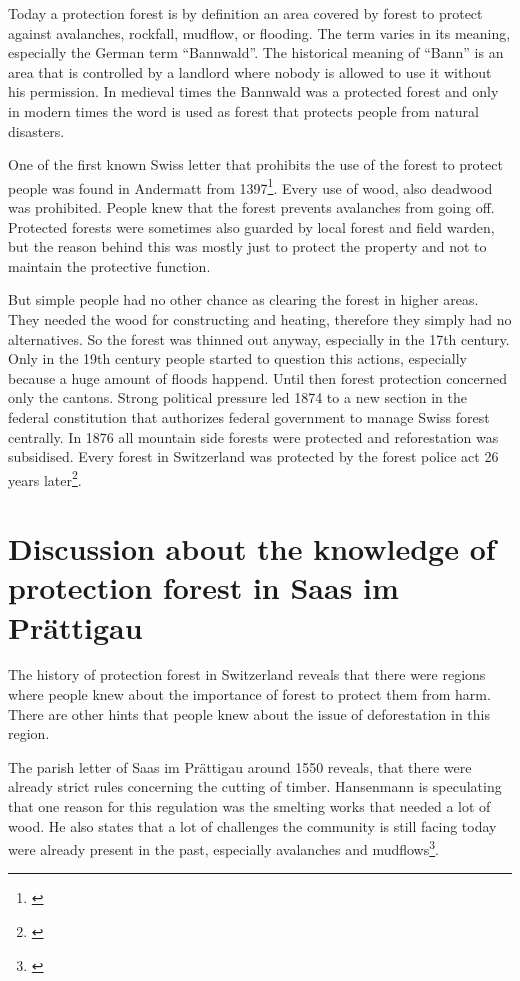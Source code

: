 \documentclass[12pt, a4paper]{article}
\begin{document}
Today a protection forest is by definition an area covered by forest to protect against avalanches, rockfall, mudflow, 
or flooding. The term varies in its meaning, especially the German term ``Bannwald''. The historical meaning of ``Bann'' 
is an area that is controlled by a landlord where nobody is allowed to use it without his permission. In medieval times 
the Bannwald was a protected forest and only in  modern times the word is used as forest that protects people from natural 
disasters.

One of the first known Swiss letter that prohibits the use of the forest to protect people was found in Andermatt 
from 1397\footnote{\citet[p.~104]{pfister2002tag}}. Every use of wood, also deadwood was prohibited. People knew that 
the forest prevents avalanches from going off. Protected forests were sometimes also guarded by local forest and field 
warden, but the reason behind this was mostly just to protect the property and not to maintain the protective function. 

But simple people had no other chance as clearing the forest in higher areas. They needed the wood for constructing and 
heating, therefore they simply had no alternatives. So the forest was thinned out anyway, especially in the 17th century. 
Only in the 19th century people started to question this actions, especially because a huge amount of floods happend. 
Until then forest protection concerned only the cantons. Strong political pressure led 1874 to a new section in the federal 
constitution that authorizes federal government to manage Swiss forest centrally. In 1876 all mountain side forests were 
protected and reforestation was subsidised. Every forest in Switzerland was protected by the forest police  
act 26 years later\footnote{\citet[p.~108]{pfister2002tag}}.

\section*{Discussion about the knowledge of protection forest in Saas im Prättigau}
The history of protection forest in Switzerland reveals that there were regions where people knew about the importance of 
forest to protect them from harm. There are other hints that people knew about the issue of deforestation in this region. 

The parish letter of Saas im Prättigau around 1550 reveals, that there were already strict rules concerning the cutting of 
timber. Hansenmann is speculating that one reason for this regulation was the smelting works that needed a lot of wood. 
He also states that a lot of challenges the community is still facing today were already present in the past, especially 
avalanches and mudflows\footnote{\citet[p.~27, 139]{hansemann1995saaser}}.
\end{document}
